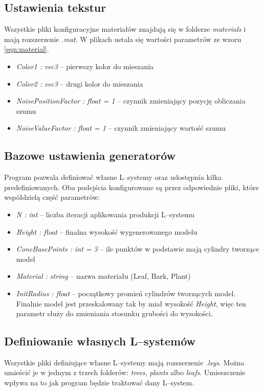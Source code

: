 \documentclass[inz,shortabstract]{iithesis}
\begin{document}
        \subsection{Ustawienia tekstur}
        Wszystkie pliki konfiguracyjne materiałów znajdują się w folderze \textit{materials} i mają rozszerzenie \textit{.mat}. W plikach ustala się wartości parametrów ze wzoru \ref{eqn:material}. 
        \begin{itemize}
            \item \textit{Color1 : vec3} -- pierwszy kolor do mieszania
            \item \textit{Color2 : vec3} -- drugi kolor do mieszania
            \item \textit{NoisePositionFactor : float = 1} -- czynnik zmieniający pozycję obliczania szumu 
            \item \textit{NoiseValueFactor : float = 1} -- czynnik zmieniający wartość szumu
        \end{itemize}
        
        \subsection{Bazowe ustawienia generatorów}
        Program pozwala definiować własne L--systemy oraz udostępnia kilka predefiniowanych. Oba podejścia konfigurowane są przez odpowiednie pliki, które współdzielą część parametrów:
        
        \begin{itemize}
            \item \textit{N : int} -- liczba iteracji aplikowania produkcji L--systemu 
            \item \textit{Height : float} -- finalna wysokość wygenerowanego modelu
            \item \textit{ConeBasePoints : int = 3} -- ile punktów w podstawie mają cylindry tworzące model
            \item \textit{Material : string} -- nazwa materiału (Leaf, Bark, Plant)
            \item \textit{InitRadius : float} -- początkowy promień cylindrów tworzących model. Finalnie model jest przeskalowany tak by miał wysokość \textit{Height}, więc ten parametr służy do zmieniania stosunku grubości do wysokości. 
        \end{itemize}
        
        \subsection{Definiowanie własnych L--systemów}
        Wszystkie pliki definiujące własne L--systemy mają rozszerzenie \textit{.lsys}. Można umieścić je w jednym z trzech folderów: \textit{trees}, \textit{plants} albo \textit{leafs}. Umieszczenie wpływa na to jak program będzie traktować dany L--system.
        
\end{document}
